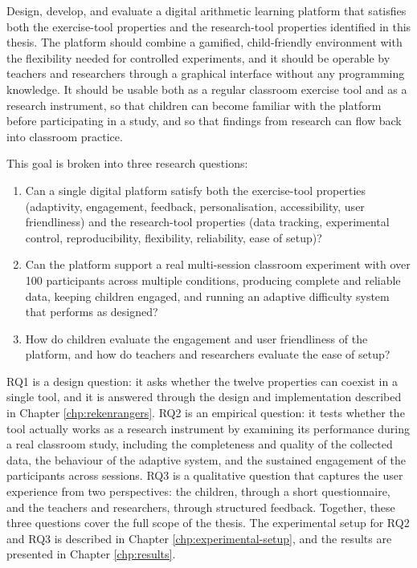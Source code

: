 \begin{tcolorbox}[
    colback=blue!4!white,
    colframe=blue!40!black,
    title=Goal and Research Questions
]
Design, develop, and evaluate a digital arithmetic learning platform that satisfies both the exercise-tool properties and the research-tool properties identified in this thesis. The platform should combine a gamified, child-friendly environment with the flexibility needed for controlled experiments, and it should be operable by teachers and researchers through a graphical interface without any programming knowledge. It should be usable both as a regular classroom exercise tool and as a research instrument, so that children can become familiar with the platform before participating in a study, and so that findings from research can flow back into classroom practice.

\medskip
This goal is broken into three research questions:
\begin{enumerate}
    \item[\textbf{RQ1}] Can a single digital platform satisfy both the exercise-tool properties (adaptivity, engagement, feedback, personalisation, accessibility, user friendliness) and the research-tool properties (data tracking, experimental control, reproducibility, flexibility, reliability, ease of setup)?
    \item[\textbf{RQ2}] Can the platform support a real multi-session classroom experiment with over 100 participants across multiple conditions, producing complete and reliable data, keeping children engaged, and running an adaptive difficulty system that performs as designed? 
    \item[\textbf{RQ3}] How do children evaluate the engagement and user friendliness of the platform, and how do teachers and researchers evaluate the ease of setup?
\end{enumerate}
\end{tcolorbox}

RQ1 is a design question: it asks whether the twelve properties can coexist in a single tool, and it is answered through the design and implementation described in Chapter \ref{chp:rekenrangers}. RQ2 is an empirical question: it tests whether the tool actually works as a research instrument by examining its performance during a real classroom study, including the completeness and quality of the collected data, the behaviour of the adaptive system, and the sustained engagement of the participants across sessions. RQ3 is a qualitative question that captures the user experience from two perspectives: the children, through a short questionnaire, and the teachers and researchers, through structured feedback. Together, these three questions cover the full scope of the thesis. The experimental setup for RQ2 and RQ3 is described in Chapter \ref{chp:experimental-setup}, and the results are presented in Chapter \ref{chp:results}.
